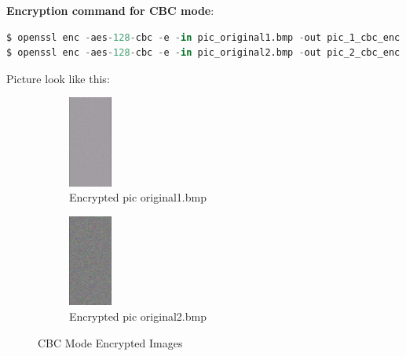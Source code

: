 \documentclass{article}
\begin{document}
\textbf{Encryption command for CBC mode}:
\begin{lstlisting}[language=Python]
$ openssl enc -aes-128-cbc -e -in pic_original1.bmp -out pic_1_cbc_enc.bmp -K 00112233445566778889aabbccddeeff -iv 0102030405060708090a0b0c0d0e0f10
$ openssl enc -aes-128-cbc -e -in pic_original2.bmp -out pic_2_cbc_enc.bmp -K 00112233445566778889aabbccddeeff -iv 0102030405060708090a0b0c0d0e0f10
\end{lstlisting}
Picture look like this:
\begin{figure}[h]
    \centering
    \begin{subfigure}{0.45\textwidth}
        \centering
        \includegraphics[height=3cm]{images/pic_1_cbc.png}
        \caption{Encrypted pic original1.bmp}
    \end{subfigure}
    \begin{subfigure}{0.45\textwidth}
        \centering
        \includegraphics[height=3cm]{images/pic_2_cbc.png}
        \caption{Encrypted pic original2.bmp}
    \end{subfigure}
    \caption{CBC Mode Encrypted Images}
\end{figure}
\end{document}
